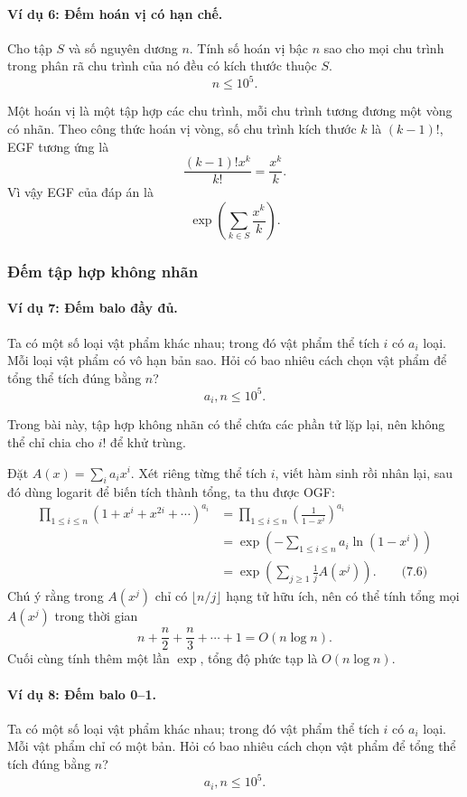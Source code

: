\documentclass[11pt]{article}
\begin{document}
\paragraph{Ví dụ 6: Đếm hoán vị có hạn chế.}
Cho tập \(S\) và số nguyên dương \(n\). Tính số hoán vị bậc \(n\) sao cho mọi
chu trình trong phân rã chu trình của nó đều có kích thước thuộc \(S\).
\[
  n\le 10^5.
\]

Một hoán vị là một tập hợp các chu trình, mỗi chu trình tương đương một vòng có
nhãn. Theo công thức hoán vị vòng, số chu trình kích thước \(k\) là
\((k-1)!\), EGF tương ứng là
\[
  \frac{(k-1)!x^k}{k!}=\frac{x^k}{k}. \tag{7.4}
\]
Vì vậy EGF của đáp án là
\[
  \exp\left(\sum_{k\in S}\frac{x^k}{k}\right). \tag{7.5}
\]

\subsubsection{Đếm tập hợp không nhãn}

\paragraph{Ví dụ 7: Đếm balo đầy đủ.}
Ta có một số loại vật phẩm khác nhau; trong đó vật phẩm thể tích \(i\) có
\(a_i\) loại. Mỗi loại vật phẩm có vô hạn bản sao. Hỏi có bao nhiêu cách chọn
vật phẩm để tổng thể tích đúng bằng \(n\)?
\[
  a_i,n\le 10^5.
\]

Trong bài này, tập hợp không nhãn có thể chứa các phần tử lặp lại, nên không
thể chỉ chia cho \(i!\) để khử trùng.

Đặt \(A(x)=\sum_i a_i x^i\). Xét riêng từng thể tích \(i\), viết hàm sinh rồi
nhân lại, sau đó dùng logarit để biến tích thành tổng, ta thu được OGF:
\[
\begin{aligned}
  \prod_{1\le i\le n}(1+x^i+x^{2i}+\cdots)^{a_i}
  &= \prod_{1\le i\le n}\left(\frac1{1-x^i}\right)^{a_i}\\
  &= \exp\left(-\sum_{1\le i\le n}a_i\ln(1-x^i)\right)\\
  &= \exp\left(\sum_{j\ge 1}\frac1j A(x^j)\right). \qquad\text{(7.6)}
\end{aligned}
\]
Chú ý rằng trong \(A(x^j)\) chỉ có \(\lfloor n/j\rfloor\) hạng tử hữu ích, nên
có thể tính tổng mọi \(A(x^j)\) trong thời gian
\[
  n+\frac n2+\frac n3+\cdots+1=O(n\log n).
\]
Cuối cùng tính thêm một lần \(\exp\), tổng độ phức tạp là \(O(n\log n)\).

\paragraph{Ví dụ 8: Đếm balo 0--1.}
Ta có một số loại vật phẩm khác nhau; trong đó vật phẩm thể tích \(i\) có
\(a_i\) loại. Mỗi vật phẩm chỉ có một bản. Hỏi có bao nhiêu cách chọn vật phẩm
để tổng thể tích đúng bằng \(n\)?
\[
  a_i,n\le 10^5.
\]
\end{document}
